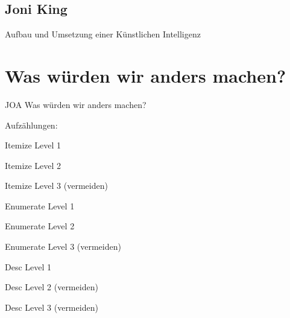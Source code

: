 \subsection{Joni King}
\begin{compactitem}
    \item
    \item Aufbau und Umsetzung einer Künstlichen Intelligenz
\end{compactitem}
\section{Was würden wir anders machen?}
JOA Was würden wir anders machen?

Aufzählungen:

\begin{compactitem}
    \item Itemize Level 1
    \begin{compactitem}
        \item Itemize Level 2
        \begin{compactitem}
            \item Itemize Level 3 (vermeiden)
        \end{compactitem}
    \end{compactitem}
\end{compactitem}

\begin{compactenum}
    \item Enumerate Level 1
    \begin{compactenum}
        \item Enumerate Level 2
        \begin{compactenum}
            \item Enumerate Level 3 (vermeiden)
        \end{compactenum}
    \end{compactenum}
\end{compactenum}

\begin{compactdesc}
    \item[Desc] Level 1
    \begin{compactdesc}
        \item[Desc] Level 2 (vermeiden)
        \begin{compactdesc}
            \item[Desc] Level 3 (vermeiden)
        \end{compactdesc}
    \end{compactdesc}
\end{compactdesc}